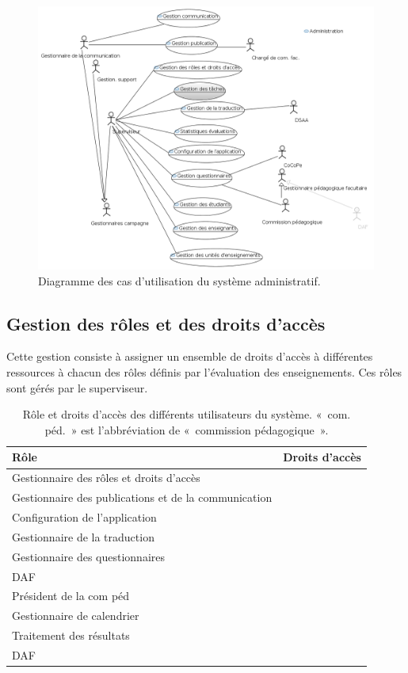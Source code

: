 \documentclass[a4paper,11pt]{report}
\begin{document}
\begin{figure}[ht]
\includegraphics[width=\linewidth]{workspace/evalens-usecases/administration.png}
\caption{Diagramme des cas d'utilisation du système administratif.}
\label{fig:usecase-admin}
\end{figure}


\subsection{Gestion des rôles et des droits d'accès}
Cette gestion consiste à assigner un ensemble de droits d'accès à différentes ressources à chacun des rôles définis par l'évaluation des enseignements.
Ces rôles sont gérés par le superviseur.

\begin{table}[ht]
\begin{tabularx}{\textwidth}{|X|l|} \hline
Rôle & Droits d'accès \\ \hline
Gestionnaire des rôles et droits d'accès & \\ \hline
Gestionnaire des publications et de la communication & \\ \hline
Configuration de l'application & \\ \hline
Gestionnaire de la traduction & \\ \hline
Gestionnaire des questionnaires & \\ \hline
DAF & \\ \hline
Président de la com péd & \\ \hline
Gestionnaire de calendrier & \\ \hline
Traitement des résultats & \\ \hline
DAF & \\ \hline

\end{tabularx}
\caption{Rôle et droits d'accès des différents utilisateurs du système. «~com. péd.~» est l'abbréviation de «~commission pédagogique~».}
\label{tab:role-droit}
\end{table}
\end{document}

